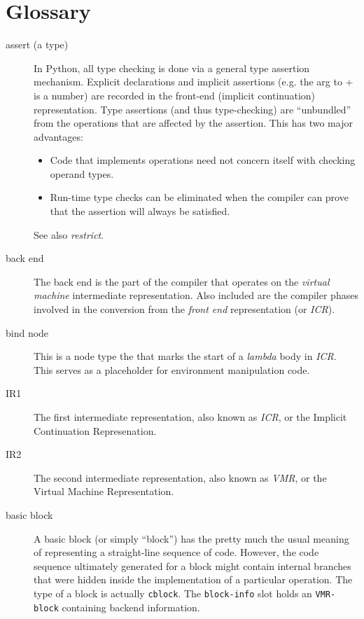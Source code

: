 \chapter{Glossary}%


\begin{description}
\item[assert (a type)]
In Python, all type checking is done via a general type assertion
mechanism.  Explicit declarations and implicit assertions (e.g. the arg to
+ is a number) are recorded in the front-end (implicit continuation)
representation.  Type assertions (and thus type-checking) are ``unbundled''
from the operations that are affected by the assertion.  This has two major
advantages:
\begin{itemize}
\item Code that implements operations need not concern itself with checking
operand types.

\item Run-time type checks can be eliminated when the compiler can prove that
the assertion will always be satisfied.
\end{itemize}
See also {\it restrict}.

\item[back end] The back end is the part of the compiler that operates on the
{\it virtual machine} intermediate representation.  Also included are the
compiler phases involved in the conversion from the {\it front end}
representation (or {\it ICR}).

\item[bind node] This is a node type the that marks the start of a {\it lambda}
body in {\it ICR}.  This serves as a placeholder for environment manipulation
code.

\item[IR1] The first intermediate representation, also known as {\it ICR}, or
the Implicit Continuation Represenation.

\item[IR2] The second intermediate representation, also known as {\it VMR}, or
the Virtual Machine Representation.

\item[basic block] A basic block (or simply ``block'') has the pretty much the
usual meaning of representing a straight-line sequence of code.  However, the
code sequence ultimately generated for a block might contain internal branches
that were hidden inside the implementation of a particular operation.  The type
of a block is actually {\tt cblock}.  The {\tt block-info} slot holds an 
{\tt VMR-block} containing backend information.


\end{description}
